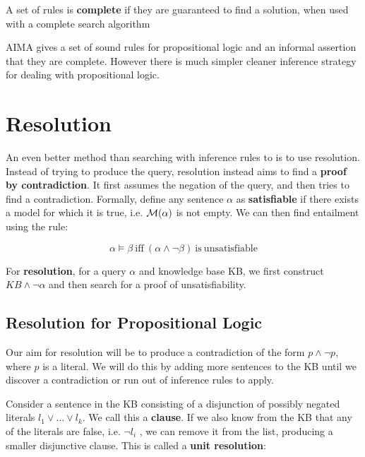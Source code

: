 \documentclass[11pt]{article}
\begin{document}
  \begin{defn}
    A set of rules is \textbf{complete} if they are guaranteed to find a solution, when used with a complete search algorithm
  \end{defn}
  

AIMA gives a set of sound rules for propositional logic and an
informal assertion that they are complete. However there is much
simpler cleaner inference strategy for dealing with propositional
logic.


\section{Resolution}

An even better method than searching with inference rules to is to use resolution. Instead of trying to produce the query, resolution
instead aims to find a \textbf{proof by contradiction}.  It first
assumes the negation of the query, and then tries to find a 
contradiction. Formally, define any sentence $\alpha$ as \textbf{satisfiable} if
there exists a model for which it is true, i.e. $\mathcal{M}(\alpha)$ is not
empty. We can then find entailment using the rule:

\[\alpha \models \beta\mathrm{\ iff\ } (\alpha \land \lnot \beta) \mathrm{\ is \ unsatisfiable}\] 

\noindent For \textbf{resolution}, for a query $\alpha$ and knowledge base KB, we first construct $KB \land \lnot \alpha$ and then search for a proof of unsatisfiability. 



\subsection{Resolution for Propositional Logic}

Our aim for resolution will be to produce a contradiction of the form $p \land \lnot p$, where $p$ is a literal. We will do this by adding more sentences to the KB until we discover a contradiction or run out of inference rules to apply.

Consider a sentence in the KB consisting of a disjunction of possibly negated literals $l_1 \lor \ldots \lor l_k$. We call this a \textbf{clause}. If we also know from the KB that any of the literals are false, i.e. $\lnot l_i$ , we can remove it from the list, producing a smaller disjunctive clause. This is called a \textbf{unit resolution}:
\end{document}
